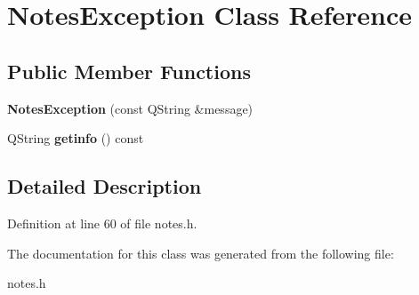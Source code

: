 \hypertarget{class_notes_exception}{}\section{Notes\+Exception Class Reference}
\label{class_notes_exception}
\subsection*{Public Member Functions}
\begin{DoxyCompactItemize}
\item 
\mbox{\label{class_notes_exception_af10aca61d1cb993b62e868f0fe9bf144}} 
{\bfseries Notes\+Exception} (const Q\+String \&message)
\item 
\mbox{\label{class_notes_exception_aaa70b4b237c0fcadf5426848b54da15e}} 
Q\+String {\bfseries getinfo} () const
\end{DoxyCompactItemize}


\subsection{Detailed Description}


Definition at line 60 of file notes.\+h.



The documentation for this class was generated from the following file\+:\begin{DoxyCompactItemize}
\item 
notes.\+h\end{DoxyCompactItemize}
